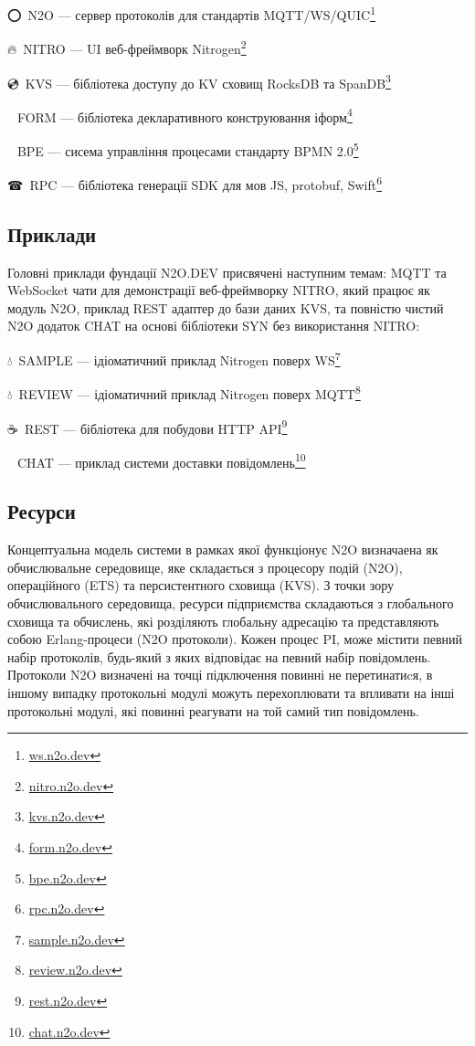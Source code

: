 \setmainfont{Segoe UI Emoji}⭕\setmainfont{Geometria}\ N2O --- сервер протоколів для стандартів MQTT/WS/QUIC\footnote{\url{ws.n2o.dev}}

\setmainfont{Segoe UI Emoji}🔥\setmainfont{Geometria}\ NITRO --- UI веб-фреймворк Nitrogen\footnote{\url{nitro.n2o.dev}}

\setmainfont{Segoe UI Emoji}💿\setmainfont{Geometria}\ KVS --- бібліотека доступу до KV сховищ RocksDB та SpanDB\footnote{\url{kvs.n2o.dev}}

\setmainfont{Segoe UI Emoji}📜\setmainfont{Geometria}\ FORM --- бібліотека декларативного конструювання іформ\footnote{\url{form.n2o.dev}}

\setmainfont{Segoe UI Emoji}💠\setmainfont{Geometria}\ BPE --- сисема управління процесами стандарту BPMN 2.0\footnote{\url{bpe.n2o.dev}}

\setmainfont{Segoe UI Emoji}☎\setmainfont{Geometria}\ RPC --- бібліотека генерації SDK для мов JS, protobuf, Swift\footnote{\url{rpc.n2o.dev}}

\subsection{Приклади}

Головні приклади фундації N2O.DEV присвячені наступним темам: MQTT та WebSocket
чати для демонстрації веб-фреймворку NITRO, який працює як модуль N2O, приклад
REST адаптер до бази даних KVS, та повністю чистий N2O додаток CHAT на основі
бібліотеки SYN без використання NITRO:

\setmainfont{Segoe UI Emoji}💧\setmainfont{Geometria}\ SAMPLE --- ідіоматичний приклад Nitrogen поверх WS\footnote{\url{sample.n2o.dev}}

\setmainfont{Segoe UI Emoji}💧\setmainfont{Geometria}\ REVIEW --- ідіоматичний приклад Nitrogen поверх MQTT\footnote{\url{review.n2o.dev}}

\setmainfont{Segoe UI Emoji}☕\setmainfont{Geometria}\ REST --- бібліотека для побудови HTTP API\footnote{\url{rest.n2o.dev}}

\setmainfont{Segoe UI Emoji}💬\setmainfont{Geometria}\ CHAT --- приклад системи доставки повідомлень\footnote{\url{chat.n2o.dev}}



\newpage
\subsection{Ресурси}

Концептуальна модель системи в рамках якої функціонує N2O визначаена як обчислювальне середовище,
яке складається з процесору подій (N2O), операційного (ETS) та персистентного сховища (KVS).
З точки зору обчислювального середовища, ресурси підприємства складаються з глобального
 сховища та обчислень, які розділяють глобальну адресацію та представляють собою
Erlang-процеси (N2O протоколи). Кожен процес PI, може містити певний набір протоколів,
будь-який з яких відповідає на певний набір повідомлень. Протоколи N2O визначені на
точці підключення повинні не перетинатиcя, в іншому випадку протокольні модулі можуть
перехоплювати та впливати на інші протокольні модулі, які повинні реагувати на той
самий тип повідомлень.

